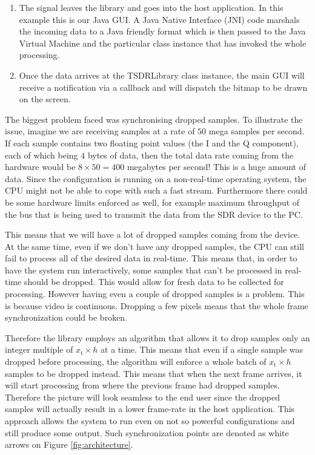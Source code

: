 \documentclass[a4paper,12pt,twoside,openright]{report}
\begin{document}
\begin{enumerate}
	\item The signal leaves the library and goes into the host application. In this example this is our Java GUI. A Java Native Interface (JNI) code marshals the incoming data to a Java friendly format which is then passed to the Java Virtual Machine and the particular class instance that has invoked the whole processing.
	\item Once the data arrives at the TSDRLibrary class instance, the main GUI will receive a notification via a callback and will dispatch the bitmap to be drawn on the screen.
\end{enumerate}

The biggest problem faced was synchronising dropped samples. To illustrate the issue, imagine we are receiving samples at a rate of $50$ mega samples per second. If each sample contains two floating point values (the I and the Q component), each of which being $4$ bytes of data, then the total data rate coming from the hardware would be $8 \times 50 = 400$ megabytes per second! This is a huge amount of data. Since the configuration is running on a non-real-time operating system, the CPU might not be able to cope with such a fast stream. Furthermore there could be some hardware limits enforced as well, for example maximum throughput of the bus that is being used to transmit the data from the SDR device to the PC.

This means that we will have a lot of dropped samples coming from the device. At the same time, even if we don't have any dropped samples, the CPU can still fail to process all of the desired data in real-time. This means that, in order to have the system run interactively, some samples that can't be processed in real-time should be dropped. This would allow for fresh data to be collected for processing. However having even a couple of dropped samples is a problem. This is because video is continuous. Dropping a few pixels means that the whole frame synchronization could be broken.

Therefore the library employs an algorithm that allows it to drop samples only an integer multiple of $x_\text{t} \times h$ at a time. This means that even if a single sample was dropped before processing, the algorithm will enforce a whole batch of $x_\text{t} \times h$ samples to be dropped instead. This means that when the next frame arrives, it will start processing from where the previous frame had dropped samples. Therefore the picture will look seamless to the end user since the dropped samples will actually result in a lower frame-rate in the host application. This approach allows the system to run even on not so powerful configurations and still produce some output. Such synchronization points are denoted as white arrows on Figure \ref{fig:architecture}.
\end{document}
